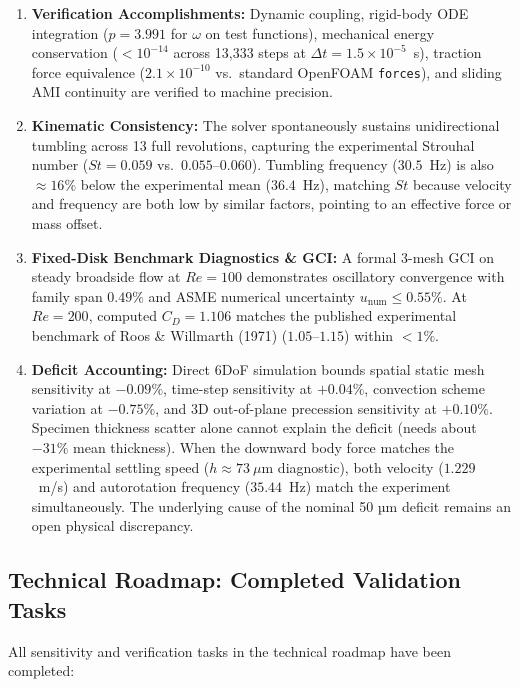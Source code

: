 \documentclass[11pt,a4paper]{article}
\begin{document}
\begin{enumerate}
    \item \textbf{Verification Accomplishments:} Dynamic coupling, rigid-body ODE integration ($p = 3.991$ for $\omega$ on test functions), mechanical energy conservation ($< 10^{-14}$ across 13,333 steps at $\Delta t = 1.5 \times 10^{-5}$~s), traction force equivalence ($2.1 \times 10^{-10}$ vs.\ standard OpenFOAM \texttt{forces}), and sliding AMI continuity are verified to machine precision.
    \item \textbf{Kinematic Consistency:} The solver spontaneously sustains unidirectional tumbling across 13 full revolutions, capturing the experimental Strouhal number ($St = 0.059$ vs.\ $0.055$--$0.060$). Tumbling frequency ($30.5$~Hz) is also $\approx 16\%$ below the experimental mean ($36.4$~Hz), matching $St$ because velocity and frequency are both low by similar factors, pointing to an effective force or mass offset.
    \item \textbf{Fixed-Disk Benchmark Diagnostics \& GCI:} A formal 3-mesh GCI on steady broadside flow at $Re = 100$ demonstrates oscillatory convergence with family span $0.49\%$ and ASME numerical uncertainty $u_{\mathrm{num}} \le 0.55\%$. At $Re = 200$, computed $C_D = 1.106$ matches the published experimental benchmark of Roos \& Willmarth (1971) ($1.05\text{--}1.15$) within $< 1\%$.
    \item \textbf{Deficit Accounting:} Direct 6DoF simulation bounds spatial static mesh sensitivity at $-0.09\%$, time-step sensitivity at $+0.04\%$, convection scheme variation at $-0.75\%$, and 3D out-of-plane precession sensitivity at $+0.10\%$. Specimen thickness scatter alone cannot explain the deficit (needs about $-31\%$ mean thickness). When the downward body force matches the experimental settling speed ($h \approx 73\ \mu$m diagnostic), both velocity ($1.229$~m/s) and autorotation frequency ($35.44$~Hz) match the experiment simultaneously. The underlying cause of the nominal 50 µm deficit remains an open physical discrepancy.
\end{enumerate}

\subsection{Technical Roadmap: Completed Validation Tasks}
All sensitivity and verification tasks in the technical roadmap have been completed:
\end{document}
